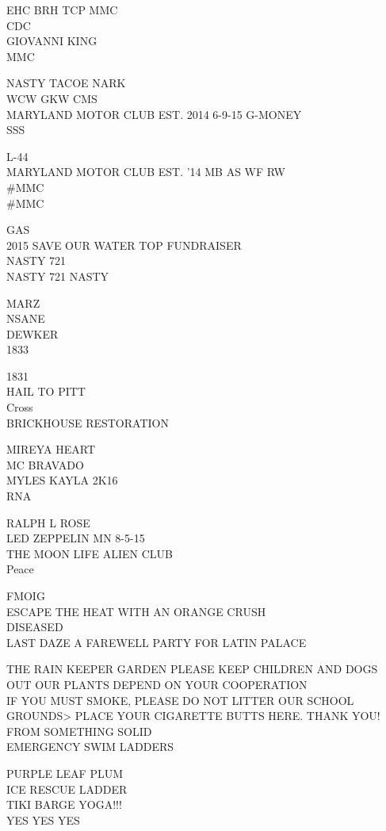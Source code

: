 \documentclass[10pt,letterpaper]{article}
\begin{document}
EHC BRH TCP MMC\\
CDC\\
GIOVANNI KING\\
MMC

NASTY TACOE NARK\\
WCW GKW CMS\\
MARYLAND MOTOR CLUB EST. 2014 6{-}9{-}15 G{-}MONEY\\
SSS

L{-}44\\
MARYLAND MOTOR CLUB EST. '14 MB AS WF RW\\
\#MMC\\
\#MMC

GAS\\
2015 SAVE OUR WATER TOP FUNDRAISER\\
NASTY 721\\
NASTY 721 NASTY

MARZ\\
NSANE\\
DEWKER\\
1833

1831\\
HAIL TO PITT\\
Cross\\
BRICKHOUSE RESTORATION

MIREYA HEART\\
MC BRAVADO\\
MYLES KAYLA 2K16\\
RNA

RALPH L ROSE\\
LED ZEPPELIN MN 8{-}5{-}15\\
THE MOON LIFE ALIEN CLUB\\
Peace

FMOIG\\
ESCAPE THE HEAT WITH AN ORANGE CRUSH\\
DISEASED\\
LAST DAZE A FAREWELL PARTY FOR LATIN PALACE

THE RAIN KEEPER GARDEN PLEASE KEEP CHILDREN AND DOGS OUT OUR PLANTS DEPEND ON YOUR COOPERATION\\
IF YOU MUST SMOKE, PLEASE DO NOT LITTER OUR SCHOOL GROUNDS>  PLACE YOUR CIGARETTE BUTTS HERE.  THANK YOU!\\
FROM SOMETHING SOLID\\
EMERGENCY SWIM LADDERS

PURPLE LEAF PLUM\\
ICE RESCUE LADDER\\
TIKI BARGE YOGA!!!\\
YES YES YES
\end{document}
